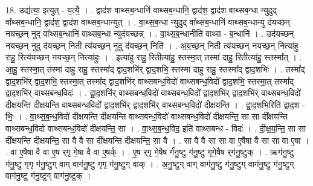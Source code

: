 \documentclass[17pt]{extarticle}
\begin{document}
18. उद्य॑त्या॒ इत्युत् - य॒त्यै॒ । . द्वाद॑श वाथ्सब॒न्धानि॑ वाथ्सब॒न्धानि॒ द्वाद॑श॒ द्वाद॑श वाथ्सब॒न्धा न्युदुद् वा᳚थ्सब॒न्धानि॒ द्वाद॑श॒ द्वाद॑श वाथ्सब॒न्धान्युत् । . वा॒थ्स॒ब॒न्धा न्युदुद् वा᳚थ्सब॒न्धानि॑ वाथ्सब॒न्धान्यु द॑यच्छन् नयच्छ॒न् नुद् वा᳚थ्सब॒न्धानि॑ वाथ्सब॒न्धा न्युद॑यच्छन्न् । . वा॒थ्स॒ब॒न्धानीति॑ वाथ्स - ब॒न्धानि॑ । . उद॑यच्छन् नयच्छ॒न् नुदु द॑यच्छ॒न् निती त्य॑यच्छ॒न् नुदु द॑यच्छ॒न् निति॑ । . अ॒य॒च्छ॒न् निती त्य॑यच्छन् नयच्छ॒न् नित्या॑हु राहु॒ रित्य॑यच्छन् नयच्छ॒न् नित्या॑हुः । . इत्या॑हु राहु॒ रितीत्या॑हु॒ स्तस्मा॒त् तस्मा॑ दाहु॒ रितीत्या॑हु॒ स्तस्मा᳚त् । . आ॒हु॒ स्तस्मा॒त् तस्मा॑ दाहु राहु॒ स्तस्मा᳚द् द्वाद॒शभि॑र् द्वाद॒शभि॒ स्तस्मा॑ दाहु राहु॒ स्तस्मा᳚द् द्वाद॒शभिः॑ । . तस्मा᳚द् द्वाद॒शभि॑र् द्वाद॒शभि॒ स्तस्मा॒त् तस्मा᳚द् द्वाद॒शभि॑र् वाथ्सबन्ध॒विदो॑ वाथ्सबन्ध॒विदो᳚ द्वाद॒शभि॒ स्तस्मा॒त् तस्मा᳚द् द्वाद॒शभि॑र् वाथ्सबन्ध॒विदः॑ । . द्वा॒द॒शभि॑र् वाथ्सबन्ध॒विदो॑ वाथ्सबन्ध॒विदो᳚ द्वाद॒शभि॑र् द्वाद॒शभि॑र् वाथ्सबन्ध॒विदो॑ दीक्षयन्ति दीक्षयन्ति वाथ्सबन्ध॒विदो᳚ द्वाद॒शभि॑र् द्वाद॒शभि॑र् वाथ्सबन्ध॒विदो॑ दीक्षयन्ति । . द्वा॒द॒शभि॒रिति॑ द्वाद॒श - भिः॒ । . वा॒थ्स॒ब॒न्ध॒विदो॑ दीक्षयन्ति दीक्षयन्ति वाथ्सबन्ध॒विदो॑ वाथ्सबन्ध॒विदो॑ दीक्षयन्ति॒ सा सा 
दी᳚क्षयन्ति वाथ्सबन्ध॒विदो॑ वाथ्सबन्ध॒विदो॑ दीक्षयन्ति॒ सा । . वा॒थ्स॒ब॒न्ध॒विद॒ इति॑ वाथ्सबन्ध - विदः॑ । . दी॒क्ष॒य॒न्ति॒ सा सा दी᳚क्षयन्ति दीक्षयन्ति॒ सा वै वै सा दी᳚क्षयन्ति दीक्षयन्ति॒ सा वै । . सा वै वै सा सा वा ए॒षैषा वै सा सा वा ए॒षा । . वा ए॒षैषा वै वा ए॒ष र्‌गृ गे॒षा वै वा ए॒षर्क् । . ए॒ष र्‌गृ गे॒षैष र्ग॑नु॒ष्टु ग॑नु॒ष्टु गृगे॒षैष र्‌ग॑नु॒ष्टुक् । . ऋग॑नु॒ष्टु ग॑नु॒ष्टु गृगृ ग॑नु॒ष्टुग् वाग् वाग॑नु॒ष्टु गृगृ ग॑नु॒ष्टुग् वाक् । . अ॒नु॒ष्टुग् वाग् वाग॑नु॒ष्टु ग॑नु॒ष्टुग् वाग॑नु॒ष्टु ग॑नु॒ष्टुग् वाग॑नु॒ष्टु ग॑नु॒ष्टुग् वाग॑नु॒ष्टुक् । \newline
\end{document}
